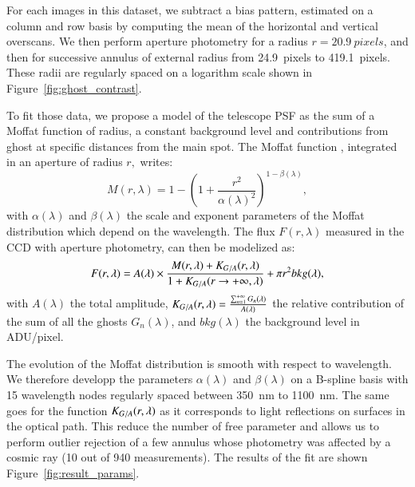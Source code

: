 For each images in this dataset, we subtract a bias pattern, estimated on a column and row basis by computing the mean of the horizontal and vertical overscans. We then perform aperture photometry for a radius $r=\SI{20.9}{pixels}$, and then for successive annulus of external radius from \SI{24.9}{pixels} to \SI{419.1}{pixels}. These radii are regularly spaced on a logarithm scale shown in Figure~\ref{fig:ghost_contrast}.

To fit those data, we propose a model of the \SD telescope PSF as the sum of a Moffat function of radius, a constant background level and contributions from ghost at specific distances from the main spot. The Moffat function \citep{moffat}, integrated in an aperture of radius $r,$ writes:
\begin{equation}
M(r, \lambda)= 1 - \left( 1+\frac{r^2}{\alpha(\lambda)^2} \right)^{1-\beta(\lambda)},
\end{equation}
with $\alpha(\lambda)$ and $\beta(\lambda)$ the scale and exponent parameters of the Moffat distribution which depend on the wavelength. The flux $F(r, \lambda)$ measured in the CCD with aperture photometry, can then be modelized as: 
\begin{equation}
F(r, \lambda) = A(\lambda) \times \frac{M(r, \lambda) + K_{G/A}(r, \lambda)}{1 + K_{G/A}(r \rightarrow +\infty, \lambda)} + \pi r^2 bkg(\lambda),
\label{eq:moffat_model}
\end{equation}
with $A(\lambda)$ the total amplitude, $K_{G/A}(r, \lambda) = \frac{\sum_{n=1}^{+\infty} G_n(\lambda)}{A(\lambda)}$ the relative contribution of the sum of all the ghosts $G_n(\lambda)$, and $bkg(\lambda)$ the background level in ADU/pixel. 

The evolution of the Moffat distribution is smooth with respect to wavelength. We therefore developp the parameters $\alpha(\lambda)$ and $\beta(\lambda)$  on a B-spline basis with 15 wavelength nodes regularly spaced between \SI{350}{\nano\meter} to \SI{1100}{\nano\meter}. The same goes for the function $K_{G/A}(r, \lambda)$ as it corresponds to light reflections on surfaces in the optical path. This reduce the number of free parameter and allows us to perform outlier rejection of a few annulus whose photometry was affected by a cosmic ray (10 out of 940 measurements). The results of the fit are shown Figure~\ref{fig:result_params}. 

